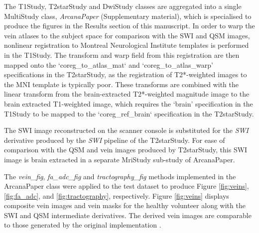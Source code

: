 \documentclass[smallextended]{svjour3}       %
\begin{document}
The T1Study, T2starStudy and DwiStudy classes are
aggregated into a single MultiStudy class,
\emph{ArcanaPaper} (Supplementary material), which is specialised to produce
the figures in the Results section of this manuscript. In order to warp the
vein atlases to the subject space for comparison with the SWI and QSM images,
nonlinear registration to Montreal Neurological Institute templates
\citep{grabner_symmetric_2006} is performed in the T1Study. The transform and warp
field from this registration are then mapped onto the `coreg\_to\_atlas\_mat` and
`coreg\_to\_atlas\_warp' specifications in the T2starStudy, as the registration of
T2*-weighted images to the MNI template is typically poor.
These transforms are combined with the linear transform from the
brain-extracted T2*-weighted magnitude image to the brain extracted T1-weighted image,
which requires the `brain' specification in the T1Study to be mapped
to the `coreg\_ref\_brain` specification in the T2starStudy.

The SWI image reconstructed on the scanner console is substituted for the \emph{SWI} derivative
produced by the \emph{SWI} pipeline of the T2starStudy. For ease of comparison
with the QSM and vein images produced by T2starStudy, this SWI image is brain extracted
in a separate MriStudy sub-study of ArcanaPaper.

The \emph{vein\_fig}, \emph{fa\_adc\_fig} and \emph{tractography\_fig} methods
implemented in the ArcanaPaper class were applied to the test dataset to produce
Figure \ref{fig:veins}, \ref{fig:fa_adc}, and \ref{fig:tractography}, respectively.
Figure \ref{fig:veins} displays composite vein images and vein masks for the healthy
volunteer along with the SWI and QSM intermediate derivatives.
The derived vein images are comparable to those
generated by the original implementation \citep{ward_combining_2018}.
\end{document}
